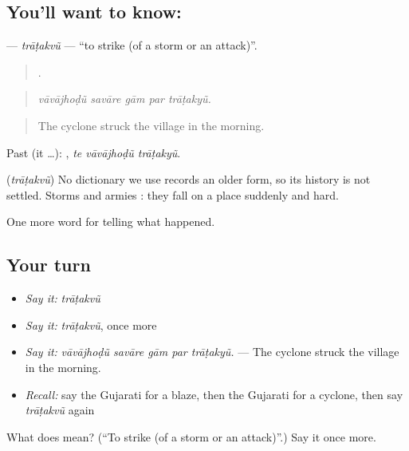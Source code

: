 \subsection*{You'll want to know: }
\textbf{} — \emph{trāṭakvũ} — \textquotedblleft{}to strike (of a storm or an attack)\textquotedblright{}.

\begin{quote}
    .
\end{quote}

\begin{quote}
\emph{vāvājhoḍũ savāre gām par trāṭakyũ.}
\end{quote}

\begin{quote}
The cyclone struck the village in the morning.
\end{quote}

Past (it …):   , \emph{te vāvājhoḍũ trāṭakyũ}.

\begin{cousinweb}
\textbf{} (\emph{trāṭakvũ}) No dictionary we use records an older form, so its history is not settled. Storms and armies \textbf{ }: they fall on a place suddenly and hard.
\end{cousinweb}

\begin{grammarlens}[title={What you've built}]
One more word for telling what happened.
\end{grammarlens}

\subsection*{Your turn}
\begin{itemize}
\raggedright
  \item \emph{Say it:} \emph{trāṭakvũ}
  \item \emph{Say it:} \emph{trāṭakvũ}, once more
  \item \emph{Say it:} \emph{vāvājhoḍũ savāre gām par trāṭakyũ.} — The cyclone struck the village in the morning.
  \item \emph{Recall:} say the Gujarati for a blaze, then the Gujarati for a cyclone, then say \emph{trāṭakvũ} again
\end{itemize}

\begin{tcolorbox}[breakable,colback=teal!4,colframe=teal!35!black,title={Before you move on}]
What does  mean? (\textquotedblleft{}To strike (of a storm or an attack)\textquotedblright{}.) Say it once more.
\end{tcolorbox}
